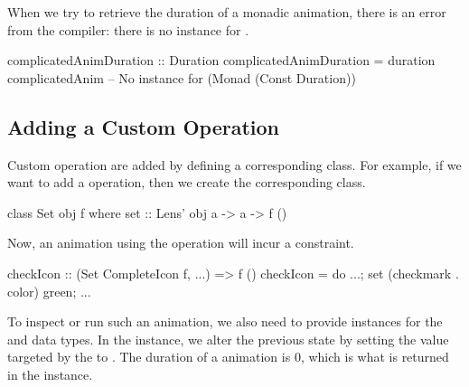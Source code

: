 When we try to retrieve the duration of a monadic animation,
there is an error from the compiler: there is no  instance for
.

\begin{spec}
complicatedAnimDuration :: Duration
complicatedAnimDuration = duration complicatedAnim
-- No instance for (Monad (Const Duration))
\end{spec}

\subsection{Adding a Custom Operation}

Custom operation are added by defining a corresponding class. For example, if we want to add a  operation, then we create the corresponding  class.

\begin{code}
class Set obj f where set :: Lens' obj a -> a -> f ()
\end{code}

Now, an animation using the  operation will incur a  constraint.

\begin{code}
checkIcon :: (Set CompleteIcon f, ...) => f ()
checkIcon = do ...; set (checkmark . color) green; ...
\end{code}

To inspect or run such an animation, we also need to provide instances for the  and  data types. In the  instance, we alter the previous state by setting the value targeted by the  to . The duration of a  animation is 0, which is what is returned in the  instance.


